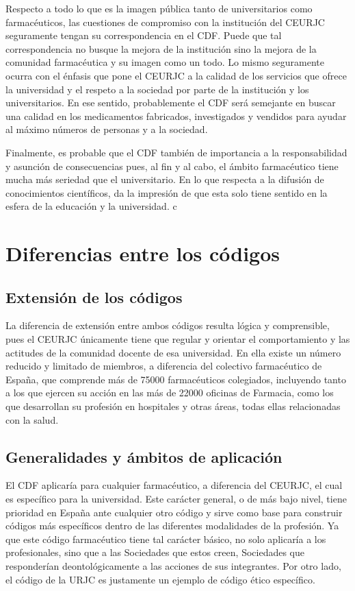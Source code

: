 \documentclass[11pt,a4paper]{article}
\begin{document}
Respecto a todo lo que es la imagen pública tanto de universitarios como farmacéuticos, las cuestiones de compromiso con la institución del CEURJC seguramente tengan su correspondencia en el CDF. Puede que tal correspondencia no busque la mejora de la institución sino la mejora de la comunidad farmacéutica y su imagen como un todo. Lo mismo seguramente ocurra con el énfasis que pone el CEURJC a la calidad de los servicios que ofrece la universidad y el respeto a la sociedad por parte de la institución y los universitarios. En ese sentido, probablemente el CDF será semejante en buscar una calidad en los medicamentos fabricados, investigados y vendidos para ayudar al máximo números de personas y a la sociedad. 

Finalmente, es probable que el CDF también de importancia a la responsabilidad y asunción de consecuencias pues, al fin y al cabo, el ámbito farmacéutico tiene mucha más seriedad que el universitario. En lo que respecta a la difusión de conocimientos científicos, da la impresión de que esta solo tiene sentido en la esfera de la educación y la universidad.
c
\section{Diferencias entre los códigos}
\subsection{Extensión de los códigos}
La diferencia de extensión entre ambos códigos resulta lógica y comprensible, pues el CEURJC únicamente tiene que regular y orientar el comportamiento y las actitudes de la comunidad docente de esa universidad. En ella existe un número reducido y limitado de miembros, a diferencia del colectivo farmacéutico de España, que comprende más de 75000 farmacéuticos colegiados, incluyendo tanto a los que ejercen su acción en las más de 22000 oficinas de Farmacia, como los que desarrollan su profesión en hospitales y otras áreas, todas ellas relacionadas con la salud. 
\subsection{Generalidades y ámbitos de aplicación}
El CDF aplicaría para cualquier farmacéutico, a diferencia del CEURJC, el cual es específico para la universidad. Este carácter general, o de más bajo nivel, tiene prioridad en España ante cualquier otro código y sirve como base para construir códigos más específicos dentro de las diferentes modalidades de la profesión. Ya que este código farmacéutico tiene tal carácter básico, no solo aplicaría a los profesionales, sino que a las Sociedades que estos creen, Sociedades que responderían deontológicamente a las acciones de sus integrantes. Por otro lado, el código de la URJC es justamente un ejemplo de código ético específico. 
\end{document}
